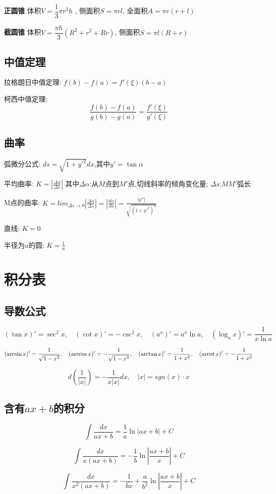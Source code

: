 \textbf{正圆锥}
体积$V=\dfrac{1}{3}\pi r^3 h$ , \quad
侧面积$S=\pi rl$, \quad
全面积$A=\pi r(r+l)$

\textbf{截圆锥}
体积$V=\dfrac{\pi h}{3}(R^2+r^2+Rr)$, \quad
侧面积$S=\pi l(R+r)$

\subsection{中值定理}
拉格朗日中值定理: $f(b)-f(a)=f'(\xi)(b-a)$

柯西中值定理: $$\frac{f(b)-f(a)}{g(b)-g(a)}=\frac{f'(\xi) }{g'(\xi)}$$
\subsection{曲率}
弧微分公式: $ds=\sqrt{1+y'^2}dx$,其中$y'=\tan \alpha$

平均曲率: $K=|\frac{\Delta\alpha}{\Delta s}|$ 其中$\Delta \alpha$:从$M$点到$M'$点,切线斜率的倾角变化量; $\Delta s$:$MM'$弧长

M点的曲率: $K=lim_{\Delta s \to 0}|\frac{\Delta\alpha}{\Delta s}|=|\frac{d \alpha}{ds}|=\frac{|y''|}{\sqrt{(1+y'^2)^3}}$

直线: $K=0$

半径为$a$的圆: $K=\frac{1}{a}$

\section{积分表}
\subsection{导数公式}
$$
(\tan x)'=\sec ^2 x,\quad
(\cot x)'=-\csc^2 x,\quad
(a^x)'=a^x\ln a,\quad
(\log_a x)'=\frac{1}{x \ln a}
$$

$$
(\arcsin x)'=\frac{1}{\sqrt{1-x^2}}, \quad
(\arccos x)'=-\frac{1}{\sqrt{1-x^2}}, \quad
(\arctan x)'=\frac{1}{1+x^2}, \quad
(\operatorname{arcot} x)'=-\frac{1}{1+x^2}
$$

$$
d(\frac{1}{|x|})=-\frac{1}{x|x|}dx, \quad |x|=sgn(x)\cdot x
$$

\subsection{含有$ax+b$的积分}

$$
\int \frac{dx}{ax+b}=\frac{1}{a}\ln|ax+b|+C
$$

$$
\int \frac{dx}{x(ax+b)}=-\frac{1}{b}\ln|\frac{ax+b}{x}|+C
$$

$$
\int \frac{dx}{x^2(ax+b)}=-\frac{ 1}{bx}+\frac{ a}{b^2}\ln |\frac{ax+b}{x}|+C
$$

